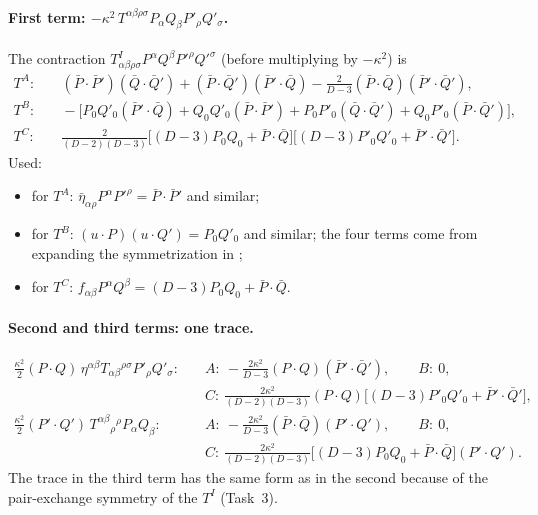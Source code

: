 \paragraph{First term: $-\kappa^2\,T^{\alpha\beta\rho\sigma}P_\alpha Q_\beta P'_\rho Q'_\sigma$.}
The contraction $T^I_{\alpha\beta\rho\sigma}P^\alpha Q^\beta P'^\rho Q'^\sigma$ (before multiplying by $-\kappa^2$) is
\begin{equation}
\begin{aligned}
T^A:&\quad (\bar P\!\cdot\!\bar P')(\bar Q\!\cdot\!\bar Q')+(\bar P\!\cdot\!\bar Q')(\bar P'\!\cdot\!\bar Q)-\tfrac{2}{D-3}(\bar P\!\cdot\!\bar Q)(\bar P'\!\cdot\!\bar Q'),\\
T^B:&\quad -\big[P_0Q'_0(\bar P'\!\cdot\!\bar Q)+Q_0Q'_0(\bar P\!\cdot\!\bar P')+P_0P'_0(\bar Q\!\cdot\!\bar Q')+Q_0P'_0(\bar P\!\cdot\!\bar Q')\big],\\
T^C:&\quad \tfrac{2}{(D-2)(D-3)}\big[(D-3)P_0Q_0+\bar P\!\cdot\!\bar Q\big]\big[(D-3)P'_0Q'_0+\bar P'\!\cdot\!\bar Q'\big].
\end{aligned}
\label{eq:ch3-c1}
\end{equation}
Used:
\begin{itemize}[leftmargin=14pt]
\item for $T^A$: $\bar\eta_{\alpha\rho}P^\alpha P'^\rho=\bar P\!\cdot\!\bar P'$ and similar;
\item for $T^B$: $(u\!\cdot\!P)(u\!\cdot\!Q')=P_0Q'_0$ and similar; the four terms come from expanding the symmetrization in ;
\item for $T^C$: $f_{\alpha\beta}P^\alpha Q^\beta=(D-3)P_0Q_0+\bar P\!\cdot\!\bar Q$.
\end{itemize}

\paragraph{Second and third terms: one trace.}
\begin{equation}
\begin{aligned}
\tfrac{\kappa^2}2(P\!\cdot\!Q)\,\eta^{\alpha\beta}T_{\alpha\beta}{}^{\rho\sigma}P'_\rho Q'_\sigma:&\quad A:\ -\tfrac{2\kappa^2}{D-3}(P\!\cdot\!Q)(\bar P'\!\cdot\!\bar Q'),\qquad B:\ 0,\\
&\quad C:\ \tfrac{2\kappa^2}{(D-2)(D-3)}(P\!\cdot\!Q)\big[(D-3)P'_0Q'_0+\bar P'\!\cdot\!\bar Q'\big],\\[3pt]
\tfrac{\kappa^2}2(P'\!\cdot\!Q')\,T^{\alpha\beta}{}_{\rho}{}^{\rho}P_\alpha Q_\beta:&\quad A:\ -\tfrac{2\kappa^2}{D-3}(\bar P\!\cdot\!\bar Q)(P'\!\cdot\!Q'),\qquad B:\ 0,\\
&\quad C:\ \tfrac{2\kappa^2}{(D-2)(D-3)}\big[(D-3)P_0Q_0+\bar P\!\cdot\!\bar Q\big](P'\!\cdot\!Q').
\end{aligned}
\label{eq:ch3-c2}
\end{equation}
The trace in the third term has the same form as in the second because of the pair-exchange symmetry of the $T^I$ (Task~3).

